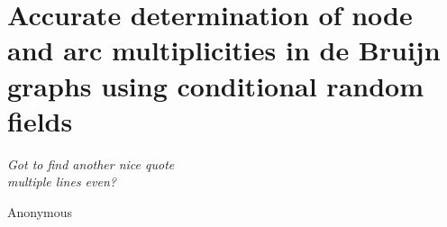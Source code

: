 \chapter{Accurate determination of node and arc multiplicities in de Bruijn graphs using conditional random fields}\label{ch2}
\setlength{\epigraphrule}{0pt}
\setlength{\epigraphwidth}{0.75\textwidth}
\epigraph{\textit{Got to find another nice quote \\ multiple lines even?}}{Anonymous}
